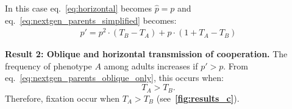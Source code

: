 \documentclass[12pt]{extarticle}
\begin{document}
In this case eq.~\ref{eq:horizontal} becomes $\hat{p}=p$ and eq.~\ref{eq:nextgen_parents_simplified} becomes:
\begin{equation} 
\begin{split}\label{eq:nextgen_parents_oblique_only}
p' = p^2\cdot(T_B-T_A) + p\cdot(1+T_A-T_B)
\end{split}
\end{equation}

\textbf{Result 2: Oblique and horizontal transmission of cooperation.} The frequency of phenotype $A$ among adults increases if $p'>p$.
From eq.~\ref{eq:nextgen_parents_oblique_only}, this occurs when:
\begin{equation} \label{eq:oblique_only_result}
T_A>T_B. 
\end{equation}
Therefore, fixation occur when $T_A>T_B$ (see~\textbf{\autoref{fig:results_c}}).
\end{document}
